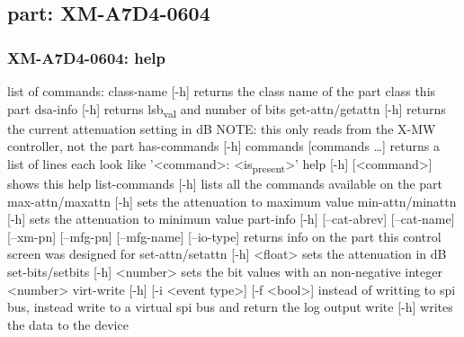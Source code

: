 \documentclass[11pt]{article}
\begin{document}
\subsection{part: XM-A7D4-0604}
\label{sec:org2786648}
\subsubsection{XM-A7D4-0604: help}
\label{sec:org2dd4520}
list of commands:
  class-name [-h]
    returns the class name of the part class this part
  dsa-info [-h]
    returns lsb\textsubscript{val} and number of bits
  get-attn/getattn [-h]
    returns the current attenuation setting in dB
    NOTE: this only reads from the X-MW controller, not the part
  has-commands [-h] commands [commands \ldots{}]
    returns a list of lines each look like '<command>: <is\textsubscript{present}>'
  help [-h] [<command>]
    shows this help
  list-commands [-h]
    lists all the commands available on the part
  max-attn/maxattn [-h]
    sets the attenuation to maximum value
  min-attn/minattn [-h]
    sets the attenuation to minimum value
  part-info  [-h] [--cat-abrev] [--cat-name] [--xm-pn] [--mfg-pn] [--mfg-name]
          [--io-type]
    returns info on the part this control screen was designed for
  set-attn/setattn [-h] <float>
    sets the attenuation in dB
  set-bits/setbits [-h] <number>
    sets the bit values with an non-negative integer <number>
  virt-write [-h] [-i <event type>] [-f <bool>]
    instead of writting to spi bus, instead write to a virtual spi bus
    and return the log output
  write [-h]
    writes the data to the device
\end{document}
